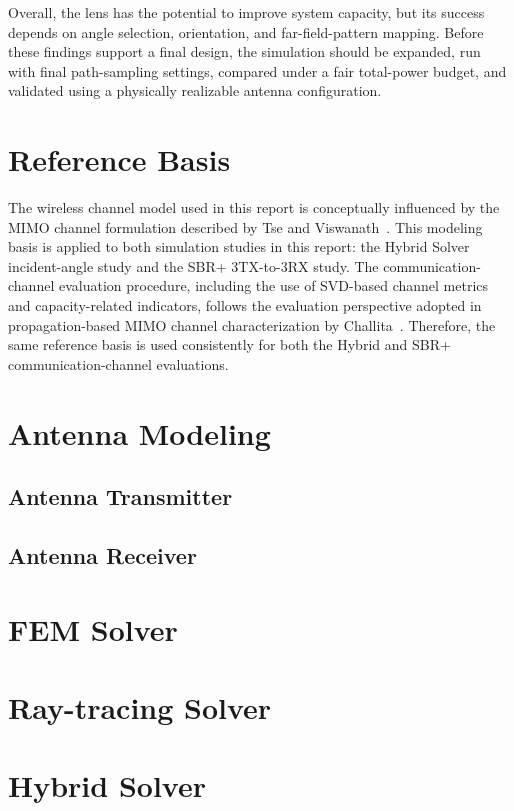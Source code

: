 \documentclass[10pt]{article}
\begin{document}
Overall, the lens has the potential to improve system capacity, but its
success depends on angle selection, orientation, and far-field-pattern
mapping. Before these findings support a final design, the simulation should
be expanded, run with final path-sampling settings, compared under a fair
total-power budget, and validated using a physically realizable antenna
configuration.


\section{Reference Basis}

The wireless channel model used in this report is conceptually influenced by the MIMO channel
formulation described by Tse and Viswanath~\cite{Tse2005}. This modeling basis is applied to both
simulation studies in this report: the Hybrid Solver incident-angle study and the SBR+ 3TX-to-3RX
study. The communication-channel evaluation procedure, including the use of SVD-based channel
metrics and capacity-related indicators, follows the evaluation perspective adopted in
propagation-based MIMO channel characterization by Challita~\cite{Challita2022}. Therefore, the same
reference basis is used consistently for both the Hybrid and SBR+ communication-channel evaluations.

\appendix
\section{Antenna Modeling}
\subsection{Antenna Transmitter}
\subsection{Antenna Receiver}


\section{FEM Solver}

\section{Ray-tracing Solver}

\section{Hybrid Solver}
\end{document}
